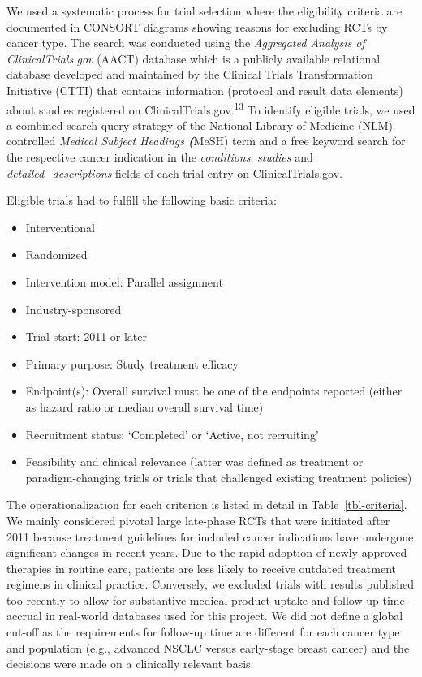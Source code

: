\documentclass[
  letterpaper,
  DIV=11,
  numbers=noendperiod]{scrartcl}
\begin{document}
We used a systematic process for trial selection where the eligibility
criteria are documented in CONSORT diagrams showing reasons for
excluding RCTs by cancer type. The search was conducted using the
\emph{Aggregated Analysis of ClinicalTrials.gov} (AACT) database which
is a publicly available relational database developed and maintained by
the Clinical Trials Transformation Initiative (CTTI) that contains
information (protocol and result data elements) about studies registered
on ClinicalTrials.gov.\textsuperscript{13} To identify eligible trials,
we used a combined search query strategy of the National Library of
Medicine (NLM)-controlled \emph{Medical Subject Headings
\textbf{(}}MeSH) term and a free keyword search for the respective
cancer indication in the \emph{conditions}, \emph{studies} and
\emph{detailed\_descriptions} fields of each trial entry on
ClinicalTrials.gov.

Eligible trials had to fulfill the following basic criteria:

\begin{itemize}
\item
  Interventional
\item
  Randomized
\item
  Intervention model: Parallel assignment
\item
  Industry-sponsored
\item
  Trial start: 2011 or later
\item
  Primary purpose: Study treatment efficacy
\item
  Endpoint(s): Overall survival must be one of the endpoints reported
  (either as hazard ratio or median overall survival time)
\item
  Recruitment status: `Completed' or `Active, not recruiting'
\item
  Feasibility and clinical relevance (latter was defined as treatment or
  paradigm-changing trials or trials that challenged existing treatment
  policies)
\end{itemize}

The operationalization for each criterion is listed in detail in
Table~\ref{tbl-criteria}. We mainly considered pivotal large late-phase
RCTs that were initiated after 2011 because treatment guidelines for
included cancer indications have undergone significant changes in recent
years. Due to the rapid adoption of newly-approved therapies in routine
care, patients are less likely to receive outdated treatment regimens in
clinical practice. Conversely, we excluded trials with results published
too recently to allow for substantive medical product uptake and
follow-up time accrual in real-world databases used for this project. We
did not define a global cut-off as the requirements for follow-up time
are different for each cancer type and population (e.g., advanced NSCLC
versus early-stage breast cancer) and the decisions were made on a
clinically relevant basis.
\end{document}
